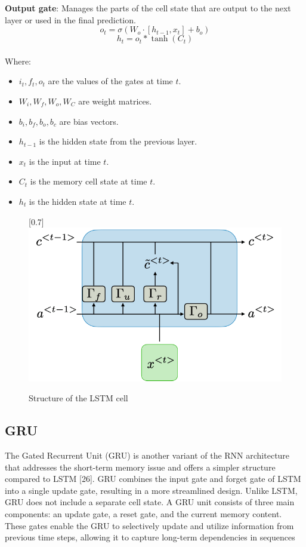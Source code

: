 \documentclass{ieeeojies}
\begin{document}
\textbf{Output gate}: Manages the parts of the cell state that are output to the next layer or used in the final prediction.
\begin{equation*}
o_t = \sigma(W_o \cdot [h_{t-1}, x_t] + b_o)
\end{equation*}
\begin{equation*}
h_t = o_t \ast \tanh(C_t)
\end{equation*}
\\Where:
\begin{itemize}
\item $i_t, f_t, o_t$ are the values of the gates at time $t$.
\item $W_i, W_f, W_o, W_C$ are weight matrices.
\item $b_i, b_f, b_o, b_c$ are bias vectors.
\item $h_{t-1}$ is the hidden state from the previous layer.
\item $x_t$ is the input at time $t$.
\item $C_t$ is the memory cell state at time $t$.
\item $h_t$ is the hidden state at time $t$.
\end{itemize}
\begin{figure}[H]
    \centering
    \begin{minipage}{0.5\textwidth}
        \centering
        \scalebox{0.7}[0.7]{\includegraphics[width=\textwidth]{bibliography/Figure/LSTM.png}}
        \caption{Structure of the LSTM cell }
        \label{fig:3}
    \end{minipage}
\end{figure}
\subsection{GRU}
The Gated Recurrent Unit (GRU) is another variant of
the RNN architecture that addresses the short-term memory
issue and offers a simpler structure compared to LSTM [26].
GRU combines the input gate and forget gate of LSTM into
a single update gate, resulting in a more streamlined design.
Unlike LSTM, GRU does not include a separate cell state.
A GRU unit consists of three main components: an
update gate, a reset gate, and the current memory content.
These gates enable the GRU to selectively update and utilize
information from previous time steps, allowing it to capture
long-term dependencies in sequences
\end{document}
